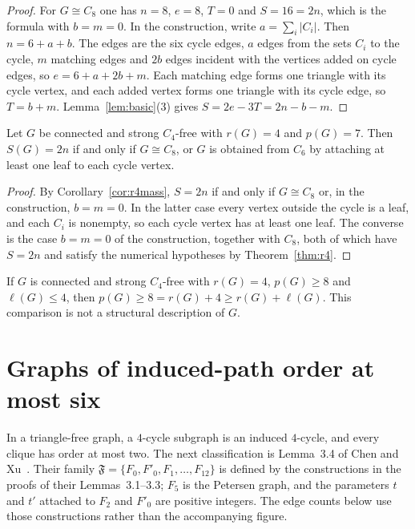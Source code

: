 \documentclass[ASNA]{USG}
\theoremstyle{WBstyletwo}
\numberwithin{equation}{section}
\newcommand{\lr}{\ell}
\newcommand{\pp}{p}
\begin{document}
\begin{proof}
For $G\cong C_8$ one has $n=8$, $e=8$, $T=0$ and $S=16=2n$, which is the formula with $b=m=0$. In the construction, write $a=\sum_i|C_i|$. Then $n=6+a+b$. The edges are the six cycle edges, $a$ edges from the sets $C_i$ to the cycle, $m$ matching edges and $2b$ edges incident with the vertices added on cycle edges, so $e=6+a+2b+m$. Each matching edge forms one triangle with its cycle vertex, and each added vertex forms one triangle with its cycle edge, so $T=b+m$. Lemma~\ref{lem:basic}(3) gives $S=2e-3T=2n-b-m$.
\end{proof}

\begin{corollary}\label{cor:r4eq}
Let $G$ be connected and strong $C_4$-free with $r(G)=4$ and $\pp(G)=7$. Then $S(G)=2n$ if and only if $G\cong C_8$, or $G$ is obtained from $C_6$ by attaching at least one leaf to each cycle vertex.
\end{corollary}

\begin{proof}
By Corollary~\ref{cor:r4mass}, $S=2n$ if and only if $G\cong C_8$ or, in the construction, $b=m=0$. In the latter case every vertex outside the cycle is a leaf, and each $C_i$ is nonempty, so each cycle vertex has at least one leaf. The converse is the case $b=m=0$ of the construction, together with $C_8$, both of which have $S=2n$ and satisfy the numerical hypotheses by Theorem~\ref{thm:r4}.
\end{proof}

\begin{remark}\label{rem:r4arith}
If $G$ is connected and strong $C_4$-free with $r(G)=4$, $\pp(G)\ge 8$ and $\lr(G)\le 4$, then $\pp(G)\ge 8=r(G)+4\ge r(G)+\lr(G)$. This comparison is not a structural description of $G$.
\end{remark}

\section{Graphs of induced-path order at most six}\label{sec:tf}

In a triangle-free graph, a $4$-cycle subgraph is an induced $4$-cycle, and every clique has order at most two. The next classification is Lemma~3.4 of Chen and Xu~\cite{chenxu}. Their family $\mathfrak F=\{F_0,F'_0,F_1,\dots,F_{12}\}$ is defined by the constructions in the proofs of their Lemmas~3.1--3.3; $F_5$ is the Petersen graph, and the parameters $t$ and $t'$ attached to $F_2$ and $F'_0$ are positive integers. The edge counts below use those constructions rather than the accompanying figure.
\end{document}
